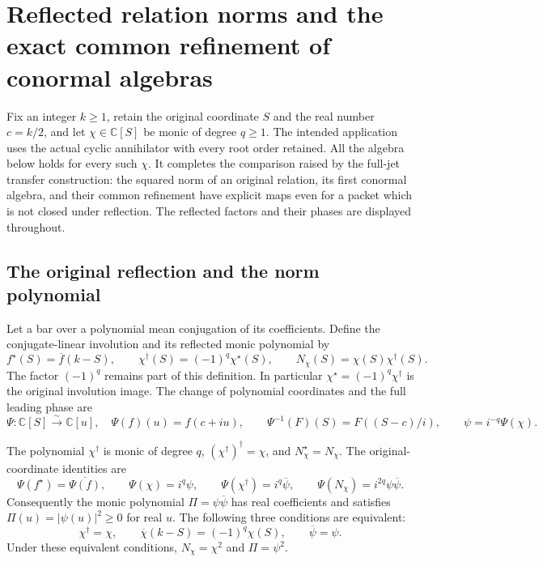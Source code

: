 \begingroup
\def\C{\mathbb C}
\def\R{\mathbb R}
\def\A{\mathcal A}
\def\J{\mathcal J}
\def\Spec{\operatorname{Spec}}
\def\lc{\operatorname{lc}}
\section{Reflected relation norms and the exact common refinement of conormal algebras}



Fix an integer $k\ge1$, retain the original coordinate $S$ and the real
number $c=k/2$, and let $\chi\in\C[S]$ be monic of degree $q\ge1$.
The intended application uses the actual cyclic annihilator with every
root order retained. All the algebra below holds for every such $\chi$.
It completes the comparison raised by the full-jet transfer construction:
the squared norm of an original relation, its first conormal algebra,
and their common refinement have explicit maps even for a packet which
is not closed under reflection. The reflected factors and their phases
are displayed throughout.

\subsection{The original reflection and the norm polynomial}

Let a bar over a polynomial mean conjugation of its coefficients. Define
the conjugate-linear involution and its reflected monic polynomial by
\[
 f^\star(S)=\overline f(k-S),\qquad
 \chi^\dagger(S)=(-1)^q\chi^\star(S),\qquad
 N_\chi(S)=\chi(S)\chi^\dagger(S).
 \tag{RF.1}
\]
The factor $(-1)^q$ remains part of this definition. In particular
$\chi^\star=(-1)^q\chi^\dagger$ is the original involution image.
The change of polynomial coordinates and the full leading phase are
\[
 \Psi:\C[S]\xrightarrow{\sim}\C[u],\quad
 \Psi(f)(u)=f(c+iu),\qquad
 \Psi^{-1}(F)(S)=F((S-c)/i),\qquad
 \psi=i^{-q}\Psi(\chi).
 \tag{RF.2}
\]

\begin{proposition}
The polynomial $\chi^\dagger$ is monic of degree $q$,
$(\chi^\dagger)^\dagger=\chi$, and $N_\chi^\star=N_\chi$.
The original-coordinate identities are
\[
 \Psi(f^\star)=\overline{\Psi(f)},\qquad
 \Psi(\chi)=i^q\psi,\qquad
 \Psi(\chi^\dagger)=i^q\overline\psi,\qquad
 \Psi(N_\chi)=i^{2q}\psi\overline\psi.
 \tag{RF.3}
\]
Consequently the monic polynomial $\Pi=\psi\overline\psi$ has real
coefficients and satisfies $\Pi(u)=|\psi(u)|^2\ge0$ for real $u$.
The following three conditions are equivalent:
\[
 \chi^\dagger=\chi,\qquad
 \overline\chi(k-S)=(-1)^q\chi(S),\qquad
 \overline\psi=\psi.
 \tag{RF.4}
\]
Under these equivalent conditions, $N_\chi=\chi^2$ and $\Pi=\psi^2$.
\end{proposition}

